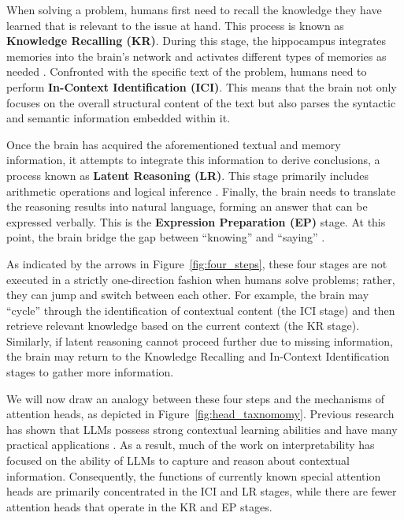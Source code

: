 \documentclass{article}
\begin{document}
When solving a problem, humans first need to recall the knowledge they have learned that is relevant to the issue at hand. This process is known as \textbf{Knowledge Recalling (KR)}. During this stage, the hippocampus integrates memories into the brain's network \citep{SquireMemory} and activates different types of memories as needed \citep{MemoryRecall}.
Confronted with the specific text of the problem, humans need to perform \textbf{In-Context Identification (ICI)}. This means that the brain not only focuses on the overall structural content of the text \citep{GeneralStructure} but also parses the syntactic \citep{Syntax} and semantic \citep{Semantic} information embedded within it.

Once the brain has acquired the aforementioned textual and memory information, it attempts to integrate this information to derive conclusions, a process known as \textbf{Latent Reasoning (LR)}. This stage primarily includes arithmetic operations \citep{ReasoningNumber} and logical inference \citep{ReasoningLogic}.
Finally, the brain needs to translate the reasoning results into natural language, forming an answer that can be expressed verbally. This is the \textbf{Expression Preparation (EP)} stage. At this point, the brain bridge the gap between ``knowing'' and ``saying'' \citep{LanguageExpress}.

As indicated by the arrows in Figure~\ref{fig:four_steps}, these four stages are not executed in a strictly one-direction fashion when humans solve problems; rather, they can jump and switch between each other. For example, the brain may ``cycle'' through the identification of contextual content (the ICI stage) and then retrieve relevant knowledge based on the current context (the KR stage). Similarly, if latent reasoning cannot proceed further due to missing information, the brain may return to the Knowledge Recalling and In-Context Identification stages to gather more information.

We will now draw an analogy between these four steps and the mechanisms of attention heads, as depicted in Figure~\ref{fig:head_taxnomomy}. Previous research has shown that LLMs possess strong contextual learning abilities and have many practical applications \citep{FewShotLearners}. As a result, much of the work on interpretability has focused on the ability of LLMs to capture and reason about contextual information. Consequently, the functions of currently known special attention heads are primarily concentrated in the ICI and LR stages, while there are fewer attention heads that operate in the KR and EP stages.
\end{document}
